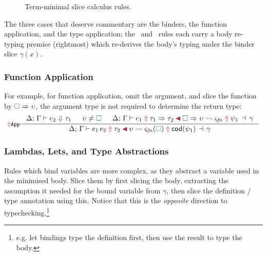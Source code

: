 \begin{figure}[p]
\bigskip


\bigskip

\centerline{\normalsize {}}

\bigskip

\centerline{\normalsize {}}
\caption{Term-minimal slice calculus rules.}
\label{fig:tmrules}
\end{figure}

\bigskip

\noindent The three cases that deserve commentary are the binders, the function application, and the type application; the \ and \ rules each carry a body re-typing premise (rightmost) which re-derives the body's typing under the binder slice $\gamma(x)$.

\subsubsection{\yo Function Application}
\label{sec:term-min-app}

For example, for function application, omit the argument, and slice the function by ${\color{teal}\Box} \Rightarrow \upsilon$, the argument type is not required to determine the return type:
\[
\inference[\synr{App}]{
  \analysis{e_2}{\tau_1}
  &
  \upsilon \neq \gap
  &
  \tmrule{e_1}{\tau_1 \Rightarrow \tau_2}{\gap \Rightarrow \upsilon}{\varsigma_{\mathit{fn}}}{\psi_1}{\gamma}
}{\tmrule{e_1\,e_2}{\tau_2}{\upsilon}{\varsigma_{\mathit{fn}}(\gap)}{\mathsf{cod}(\psi_1)}{\gamma}}
\]

\subsubsection{\yo Lambdas, Lets, and Type Abstractions}
\label{sec:term-min-binders}

Rules which bind variables are more complex, as they abstract a variable used in the minimised body. Slice them by first slicing the body, extracting the assumption it needed for the bound variable from $\gamma$, then slice the definition / type annotation using this. Notice that this is the \textit{opposite} direction to typechecking.\footnote{e.g. let bindings type the definition first, then use the result to type the body.}

